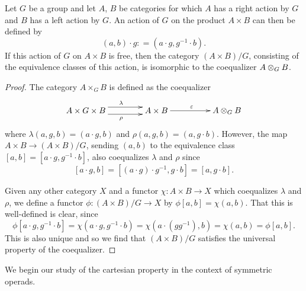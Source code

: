 \begin{lem}\label{coeq-lem}
Let $G$ be a group and let $A$, $B$ be categories for which $A$ has a right action by $G$ and $B$ has a left action by $G$. An action of $G$ on the product $A \times B$ can then be defined by
    \[
        (a,b) \cdot g \colon = \left(a \cdot g, g^{-1} \cdot b\right).
    \]
If this action of $G$ on $A \times B$ is free, then the category $(A \times B)/G$, consisting of the equivalence classes of this action, is isomorphic to the coequalizer $\coeqb{A}{B}{G}$.
\end{lem}
\begin{proof}
The category $A \times_G B$ is defined as the coequalizer
    \[
        \xy
            (0,0)*+{A \times G \times B}="00";
            (30,0)*+{A \times B}="10";
            (60,0)*+{\coeqb{A}{B}{G}}="20";
            {\ar@<1ex>^{\lambda} "00" ; "10"};
            {\ar@<-1ex>_{\rho} "00" ; "10"};
            {\ar^{\varepsilon} "10" ; "20"};
        \endxy
    \]
where $\lambda(a,g,b) = (a \cdot g, b)$ and $\rho(a,g,b) = (a, g \cdot b)$. However, the map $A \times B \rightarrow (A \times B)/G$, sending $(a,b)$ to the equivalence class $[a,b] = [a \cdot g, g^{-1} \cdot b]$, also coequalizes $\lambda$ and $\rho$ since
    \[
        [a \cdot g, b] = \left[(a \cdot g) \cdot g^{-1}, g \cdot b\right] = [a, g \cdot b].
    \]

Given any other category $X$ and a functor $\chi \colon A \times B \rightarrow X$ which coequalizes $\lambda$ and $\rho$, we define a functor $\phi \colon (A \times B)/G \rightarrow X$ by $\phi[a,b] = \chi(a,b)$. That this is well-defined is clear, since
    \[
        \phi\left[a \cdot g, g^{-1} \cdot b\right] = \chi\left(a \cdot g, g^{-1} \cdot b\right) = \chi\left(a \cdot \left(gg^{-1}\right), b\right) = \chi(a, b) = \phi[a,b].
    \]
This is also unique and so we find that $(A \times B)/G$ satisfies the universal property of the coequalizer.
\end{proof}

We begin our study of the cartesian property in the context of symmetric operads.

